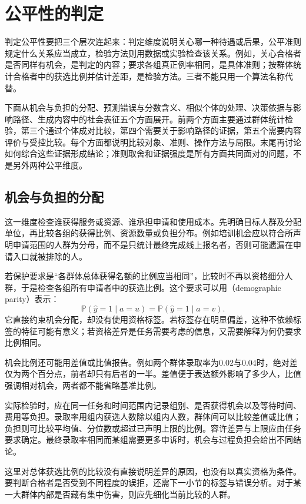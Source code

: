 \section{公平性的判定}
\label{sec:fairness-criteria}

判定公平性要把三个层次连起来：判定维度说明关心哪一种待遇或后果，公平准则规定什么关系应当成立，检验方法则用数据或实验检查该关系。例如，关心合格者是否同样有机会，是判定的内容；要求各组真正例率相同，是具体准则；按群体统计合格者中的获选比例并估计差距，是检验方法。三者不能只用一个算法名称代替。

下面从机会与负担的分配、预测错误与分数含义、相似个体的处理、决策依据与影响路径、生成内容中的社会表征五个方面展开。前两个方面主要通过群体统计检验，第三个通过个体成对比较，第四个需要关于影响路径的证据，第五个需要内容评价与受控比较。每个方面都说明比较对象、准则、操作方法与局限。末尾再讨论如何综合这些证据形成结论；准则取舍和证据强度是所有方面共同面对的问题，不是另外两种公平维度。

\subsection{机会与负担的分配}
\label{sec:fairness-group-comparison}

这一维度检查谁获得服务或资源、谁承担申请和使用成本。先明确目标人群及分配单位，再比较各组的获得比例、资源数量或负担分布。例如培训机会应以符合所声明申请范围的人群为分母，而不是只统计最终完成线上报名者，否则可能遗漏在申请入口就被排除的人。

若保护要求是“各群体总体获得名额的比例应当相同”，比较时不再以资格细分人群，于是检查各组所有申请者中的获选比例。这个要求可以用（demographic parity）表示：
\[
 \mathbb P(\hat y=1\mid a=u)
 =\mathbb P(\hat y=1\mid a=v).
\]
它直接约束机会分配，却没有使用资格标签。若标签存在明显偏差，这种不依赖标签的特征可能有意义；若资格差异是任务需要考虑的信息，又需要解释为何仍要求比例相同。

机会比例还可能用差值或比值报告。例如两个群体录取率为$0.02$与$0.04$时，绝对差仅为两个百分点，前者却只有后者的一半。差值便于表达额外影响了多少人，比值强调相对机会，两者都不能省略基准比例。

实际检验时，应在同一任务和时间范围内记录组别、是否获得机会以及等待时间、费用等负担。录取率用组内获选人数除以组内人数，群体间可以比较差值或比值；负担则可比较平均值、分位数或超过已声明上限的比例。容许差异与上限应由任务要求确定。最终录取率相同而某组需要更多申诉时，机会与过程负担会给出不同结论。

这里对总体获选比例的比较没有直接说明差异的原因，也没有以真实资格为条件。要判断合格者是否受到不同程度的误拒，还需下一小节的标签与错误分析。对于某一大群体内部是否藏有集中伤害，则应先细化当前比较的人群。

